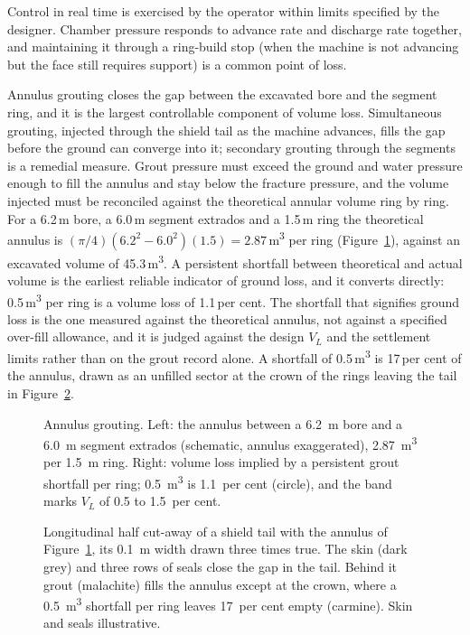 Control in real time is exercised by the operator within limits specified by
the designer.
Chamber pressure responds to advance rate and discharge rate together, and
maintaining it through a ring-build stop (when the machine is not advancing
but the face still requires support) is a common point of loss.

Annulus grouting closes the gap between the excavated bore and the segment
ring, and it is the largest controllable component of volume loss. Simultaneous
grouting, injected through the shield tail as the machine advances, fills the
gap before the ground can converge into it; secondary grouting through the
segments is a remedial measure. Grout pressure must exceed the
ground and water pressure enough to fill the annulus and stay below the
fracture pressure, and the volume injected must be reconciled against the
theoretical annular volume ring by ring. For a 6.2\,m bore, a 6.0\,m segment
extrados and a 1.5\,m ring the theoretical annulus is
$(\pi/4)(6.2^2 - 6.0^2)(1.5) = 2.87$\,m\textsuperscript{3} per ring
(Figure~\ref{fig:annulus-grout}), against
an excavated volume of 45.3\,m\textsuperscript{3}. A persistent shortfall
between theoretical and actual volume is the earliest reliable indicator of
ground loss, and it converts directly: 0.5\,m\textsuperscript{3} per ring
is a volume loss of 1.1\,per cent. The shortfall that signifies ground loss
is the one measured against the theoretical annulus, not against a specified
over-fill allowance, and it is judged against the design $V_L$ and the
settlement limits rather than on the grout record alone. A shortfall of
0.5\,m\textsuperscript{3} is 17\,per cent of the annulus, drawn as an unfilled
sector at the crown of the rings leaving the tail in
Figure~\ref{fig:r3d-shield-tail}.

\begin{figure}[htbp]
\centering
{}
\caption{Annulus grouting. Left: the annulus between a 6.2~m bore and a 6.0~m segment extrados (schematic, annulus exaggerated), 2.87~m\textsuperscript{3} per 1.5~m ring. Right: volume loss implied by a persistent grout shortfall per ring; 0.5~m\textsuperscript{3} is 1.1~per cent (circle), and the band marks $V_L$ of 0.5 to 1.5~per cent.}
\label{fig:annulus-grout}
\end{figure}

\begin{figure}[htbp]
\centering
{}
\caption{Longitudinal half cut-away of a shield tail with the annulus of Figure~\ref{fig:annulus-grout}, its 0.1~m width drawn three times true. The skin (dark grey) and three rows of seals close the gap in the tail. Behind it grout (malachite) fills the annulus except at the crown, where a 0.5~m\textsuperscript{3} shortfall per ring leaves 17~per cent empty (carmine). Skin and seals illustrative.}
\label{fig:r3d-shield-tail}
\end{figure}

